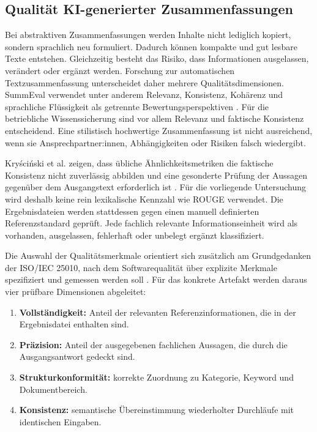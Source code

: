 \documentclass[
  10pt,
  ngerman,
  a4paper,
  toc=graduated,
  numbers=noenddot,
  headings=standardclasses,
  nonumberlist
]{scrartcl}
\begin{document}
\subsection{Qualität KI-generierter Zusammenfassungen}

Bei abstraktiven Zusammenfassungen werden Inhalte nicht lediglich kopiert, sondern sprachlich neu formuliert. Dadurch können kompakte und gut lesbare Texte entstehen. Gleichzeitig besteht das Risiko, dass Informationen ausgelassen, verändert oder ergänzt werden. Forschung zur automatischen Textzusammenfassung unterscheidet daher mehrere Qualitätsdimensionen. SummEval verwendet unter anderem Relevanz, Konsistenz, Kohärenz und sprachliche Flüssigkeit als getrennte Bewertungsperspektiven \cite{fabbri2021}. Für die betriebliche Wissenssicherung sind vor allem Relevanz und faktische Konsistenz entscheidend. Eine stilistisch hochwertige Zusammenfassung ist nicht ausreichend, wenn sie Ansprechpartner:innen, Abhängigkeiten oder Risiken falsch wiedergibt.

Kryściński et al. zeigen, dass übliche Ähnlichkeitsmetriken die faktische Konsistenz nicht zuverlässig abbilden und eine gesonderte Prüfung der Aussagen gegenüber dem Ausgangstext erforderlich ist \cite{kryscinski2020}. Für die vorliegende Untersuchung wird deshalb keine rein lexikalische Kennzahl wie ROUGE verwendet. Die Ergebnisdateien werden stattdessen gegen einen manuell definierten Referenzstandard geprüft. Jede fachlich relevante Informationseinheit wird als vorhanden, ausgelassen, fehlerhaft oder unbelegt ergänzt klassifiziert.

Die Auswahl der Qualitätsmerkmale orientiert sich zusätzlich am Grundgedanken der ISO/IEC 25010, nach dem Softwarequalität über explizite Merkmale spezifiziert und gemessen werden soll \cite{iso25010}. Für das konkrete Artefakt werden daraus vier prüfbare Dimensionen abgeleitet:

\begin{enumerate}
\item \textbf{Vollständigkeit:} Anteil der relevanten Referenzinformationen, die in der Ergebnisdatei enthalten sind.
\item \textbf{Präzision:} Anteil der ausgegebenen fachlichen Aussagen, die durch die Ausgangsantwort gedeckt sind.
\item \textbf{Strukturkonformität:} korrekte Zuordnung zu Kategorie, Keyword und Dokumentbereich.
\item \textbf{Konsistenz:} semantische Übereinstimmung wiederholter Durchläufe mit identischen Eingaben.
\end{enumerate}
\end{document}

